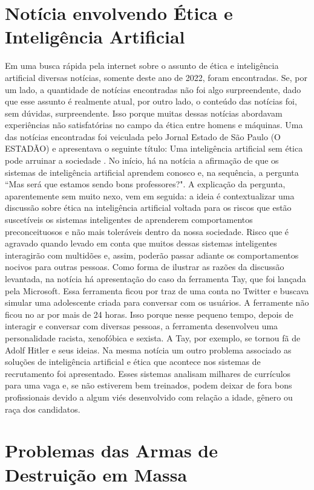 \documentclass{article}
\begin{document}
\section*{Notícia envolvendo Ética e Inteligência Artificial}
Em uma busca rápida pela internet sobre o assunto de ética e inteligência artificial diversas notícias, somente deste ano de 2022, foram encontradas. Se, por um lado, a quantidade de notícias encontradas não foi algo surpreendente, dado que esse assunto é realmente atual, por outro lado, o conteúdo das notícias foi, sem dúvidas, surpreendente. Isso porque muitas dessas notícias abordavam experiências não satisfatórias no campo da ética entre homens e máquinas. Uma das notícias encontradas foi veiculada pelo Jornal Estado de São Paulo (O ESTADÃO) e apresentava o seguinte título: Uma inteligência artificial sem ética pode arruinar a sociedade \cite{Estadao_online}. No início, há na notícia a afirmação de que os sistemas de inteligência artificial aprendem conosco e, na sequência, a pergunta ``Mas será que estamos sendo bons professores?". A explicação da pergunta, aparentemente sem muito nexo, vem em seguida: a ideia é contextualizar uma discussão sobre ética na inteligência artificial voltada para os riscos que estão suscetíveis os sistemas inteligentes de aprenderem comportamentos preconceituosos e não mais toleráveis dentro da nossa sociedade. Risco que é agravado quando levado em conta que muitos dessas sistemas inteligentes interagirão com multidões e, assim, poderão passar adiante os comportamentos nocivos para outras pessoas. Como forma de ilustrar as razões da discussão levantada, na notícia há apresentação do caso da ferramenta Tay, que foi lançada pela Microsoft. Essa ferramenta ficou por traz de uma conta no Twitter e buscava simular uma adolescente criada para conversar com os usuários. A ferramente não ficou no ar por mais de 24 horas. Isso porque nesse pequeno tempo, depois de interagir e conversar com diversas pessoas, a ferramenta desenvolveu uma personalidade racista, xenofóbica e sexista. A Tay, por exemplo, se tornou fã de Adolf Hitler e seus ideias. Na mesma notícia um outro problema associado as soluções de inteligência artificial e ética que acontece nos sistemas de recrutamento foi apresentado. Esses sistemas analisam milhares de currículos para uma vaga e, se não estiverem bem treinados, podem deixar de fora bons profissionais devido a algum viés desenvolvido com relação a idade, gênero ou raça dos candidatos.



\section*{Problemas das Armas de Destruição em Massa}


\end{document}
